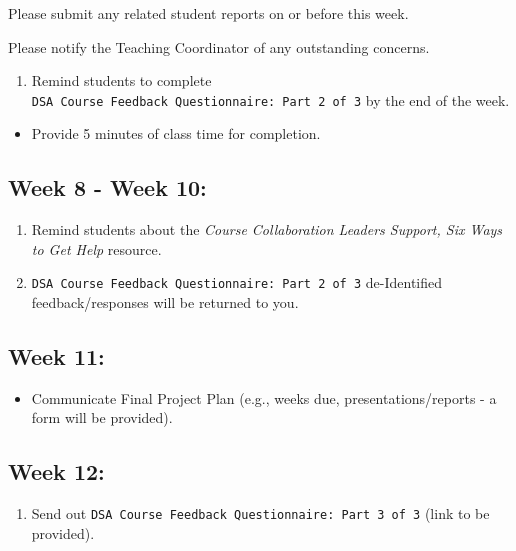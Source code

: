 \documentclass[
]{book}
\providecommand{\tightlist}{%
  \setlength{\itemsep}{0pt}\setlength{\parskip}{0pt}}
\begin{document}
Please submit any related student reports on or before this week.

Please notify the Teaching Coordinator of any outstanding concerns.

\begin{enumerate}
\def\labelenumi{\arabic{enumi})}
\setcounter{enumi}{2}
\tightlist
\item
  Remind students to complete \texttt{DSA\ Course\ Feedback\ Questionnaire:\ Part\ 2\ of\ 3} by the end of the week.
\end{enumerate}

\begin{itemize}
\tightlist
\item
  Provide 5 minutes of class time for completion.
\end{itemize}

\hypertarget{week-8---week-10}{%
\subsection{Week 8 - Week 10:}\label{week-8---week-10}}

\begin{enumerate}
\def\labelenumi{\arabic{enumi})}
\item
  Remind students about the \emph{Course Collaboration Leaders Support, Six Ways to Get Help} resource.
\item
  \texttt{DSA\ Course\ Feedback\ Questionnaire:\ Part\ 2\ of\ 3} de-Identified feedback/responses will be returned to you.
\end{enumerate}

\hypertarget{week-11}{%
\subsection{Week 11:}\label{week-11}}

\begin{itemize}
\tightlist
\item
  Communicate Final Project Plan (e.g., weeks due, presentations/reports - a form will be provided).
\end{itemize}

\hypertarget{week-12}{%
\subsection{Week 12:}\label{week-12}}

\begin{enumerate}
\def\labelenumi{\arabic{enumi})}
\tightlist
\item
  Send out \texttt{DSA\ Course\ Feedback\ Questionnaire:\ Part\ 3\ of\ 3} (link to be provided).
\end{enumerate}
\end{document}
